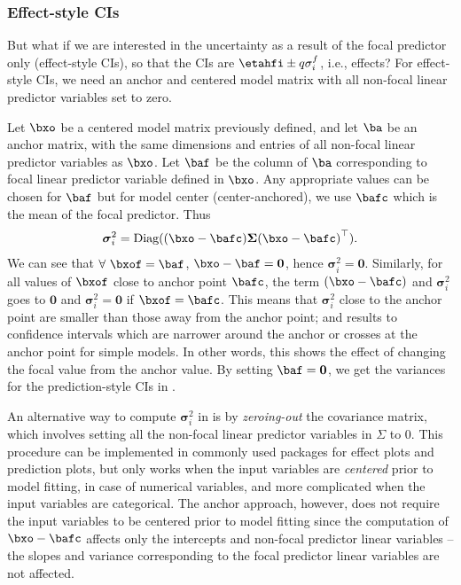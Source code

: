 \subsubsection{Effect-style CIs}

But what if we are interested in the uncertainty as a result of the focal predictor only (effect-style CIs), so that the CIs are $\etahfi \pm q\sigma^f_i$, i.e., effects? For effect-style CIs, we need an anchor and centered model matrix with all non-focal linear predictor variables set to zero. 

Let $\bxo$ be a centered model matrix previously defined, and let $\ba$ be an anchor matrix, with the same dimensions and entries of all non-focal linear predictor variables as $\bxo$. Let $\baf$ be the column of $\ba$ corresponding to focal linear predictor variable defined in $\bxo$. Any appropriate values can be chosen for $\baf$ but for model center (center-anchored), we use $\bafc$ which is the mean of the focal predictor. Thus 
%
\begin{align}\label{eq:centered_variance}
\boldsymbol\sigma^2_i = \textrm{Diag}((\bxo - \bafc) \boldsymbol{\Sigma} {(\bxo - \bafc)}^\top).
\end{align}
%
We can see that $\forall ~\bxof=\baf$, $\bxo - \baf = \boldsymbol 0$, hence $\boldsymbol\sigma_i^2 = \boldsymbol{0}$. Similarly, for all values of $\bxof$ close to anchor point $\bafc$, the term $(\bxo - \bafc)$ and $\boldsymbol\sigma_i^2$ goes to $\boldsymbol 0$ and $\boldsymbol\sigma_i^2 = \boldsymbol 0$ if $\bxof=\bafc$. This means that $\boldsymbol\sigma_i^2$ close to the anchor point are smaller than those away from the anchor point; and results to confidence intervals which are narrower around the anchor or crosses at the anchor point for simple models. In other words, this shows the effect of changing the focal value from the anchor value. By setting $\baf = \boldsymbol 0$, we get the variances for the prediction-style CIs in .

An alternative way to compute $\boldsymbol\sigma^2_i$ in  is
by \emph{zeroing-out} the covariance matrix, which involves setting all the non-focal
linear predictor variables in $\Sigma$ to $0$. This procedure can be implemented 
in commonly used  packages for effect plots and prediction plots, but only
works when the input variables are \emph{centered} prior to model fitting, in case of
numerical variables, and more complicated when the input variables are categorical. 
The anchor approach, however, does not require the input variables to be centered
prior to model fitting since the computation of $\bxo - \bafc$ affects only the 
intercepts and non-focal predictor linear variables -- the slopes and variance
corresponding to the focal predictor linear variables are not affected. 


